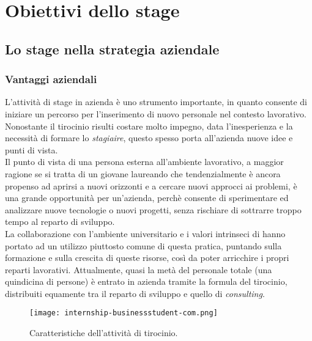 \newpage
\chapter{Obiettivi dello stage}
\label{cap:obiettivi-stage}
\section{Lo stage nella strategia aziendale}
\subsection{Vantaggi aziendali}
L'attività di stage in azienda è uno strumento importante, in quanto consente di iniziare un percorso per l'inserimento di nuovo personale nel contesto lavorativo.\\
Nonostante il tirocinio risulti costare molto impegno, data l'inesperienza e la necessità di formare lo \textit{stagiaire}, questo spesso porta all'azienda nuove idee e punti di vista.\\
Il punto di vista di una persona esterna all'ambiente lavorativo, a maggior ragione se si tratta di un giovane laureando che tendenzialmente è ancora propenso ad aprirsi a nuovi orizzonti e a cercare nuovi approcci ai problemi, è una grande opportunità per un'azienda, perchè consente di sperimentare ed analizzare nuove tecnologie o nuovi progetti, senza rischiare di sottrarre troppo tempo al reparto di sviluppo.\\
La collaborazione con l'ambiente universitario e i valori intrinseci di \AD{} hanno portato ad un utilizzo piuttosto comune di questa pratica, puntando sulla formazione e sulla crescita di queste risorse, così da poter arricchire i propri reparti lavorativi. Attualmente, quasi la metà del personale totale (una quindicina di persone) è entrato in azienda tramite la formula del tirocinio, distribuiti equamente tra il reparto di sviluppo e quello di \textit{consulting}.

\begin{figure}[h]
\texttt{[image: internship-businessstudent-com.png]}
\centering
\caption{Caratteristiche dell'attività di tirocinio.} 
\label{fig:internship}
\end{figure}

